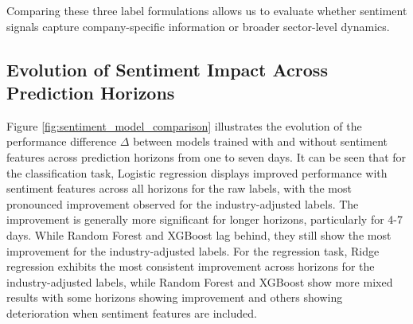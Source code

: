 Comparing these three label formulations allows us to evaluate whether sentiment signals capture company-specific information or broader sector-level dynamics.

\subsection{Evolution of Sentiment Impact Across Prediction Horizons}

Figure \ref{fig:sentiment_model_comparison} illustrates the evolution of the performance difference $\Delta$ between models trained with and without sentiment features across prediction horizons from one to seven days.
It can be seen that for the classification task, Logistic regression displays improved performance with sentiment features 
across all horizons for the raw labels, with the most pronounced improvement observed for the industry-adjusted labels. 
The improvement is generally more significant for longer horizons, particularly for 4-7 days.
While Random Forest and XGBoost lag behind, they still show the most improvement for the industry-adjusted labels.
For the regression task, Ridge regression exhibits the most consistent improvement across horizons for the industry-adjusted 
labels, while Random Forest and XGBoost show more mixed results with some horizons showing improvement and others showing deterioration when sentiment features are included.

